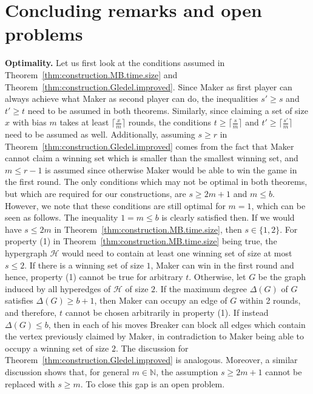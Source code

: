 \documentclass[reqno, 12pt]{amsart}
\numberwithin{equation}{section}
\numberwithin{figure}{section}
\begin{document}


\section{Concluding remarks and open problems}\label{sec:concluding}

\textbf{Optimality.}
Let us first look at the conditions assumed in
Theorem~\ref{thm:construction.MB.time.size} and
Theorem~\ref{thm:construction.Gledel.improved}.
Since Maker as first player can always achieve
what Maker as second player can do, the inequalities
$s'\geq s$ and $t'\geq t$ need to be assumed in both theorems.
Similarly, since claiming a set of size $x$ with bias $m$
takes at least $\lceil \frac{x}{m} \rceil$ rounds,
the conditions $t\geq \lceil \frac{s}{m} \rceil$ and
$t'\geq \lceil \frac{s'}{m} \rceil$ need to be assumed as well.
Additionally, assuming $s\geq r$ in Theorem~\ref{thm:construction.Gledel.improved} comes from the fact that Maker cannot claim a winning set which is smaller than the smallest winning set, and $m\leq r-1$ is assumed since otherwise Maker would be able to win the game in the first round.
The only conditions which may not be optimal in both theorems, 
but which are required for our constructions, 
are $s\geq 2m+1$ and $m\leq b$. However, we note that these conditions are still optimal for $m=1$, which can be seen as follows. The inequality $1=m\leq b$ is clearly satisfied then.
If we would have $s\leq 2m$ in Theorem~\ref{thm:construction.MB.time.size}, then $s\in \{1,2\}$.
For property (1) in Theorem~\ref{thm:construction.MB.time.size} being true,
the hypergraph $\mathcal{H}$ would need to contain at least one winning set of size at most $s\leq 2$. If there is a winning set of size $1$, Maker can win in the first round and hence, property (1) cannot be true for arbitrary $t$. Otherwise, let $G$ be the graph induced by all hyperedges of $\mathcal{H}$ of size $2$. If 
the maximum degree $\Delta(G)$ of $G$ satisfies $\Delta(G)\geq b+1$, then Maker can occupy an edge of $G$ within 2 rounds, and therefore, $t$ cannot be chosen arbitrarily in property (1). 
If instead $\Delta(G)\leq b$, then in each of his moves Breaker can block all edges which contain the vertex previously claimed by Maker,
in contradiction to Maker being able to occupy a winning set of size $2$. The discussion for Theorem~\ref{thm:construction.Gledel.improved} is analogous.
Moreover, a similar discussion shows that, for general $m\in\mathbb{N}$, the assumption $s\geq 2m+1$ cannot be replaced with $s\geq m$. To close this gap is an open problem.
\end{document}
